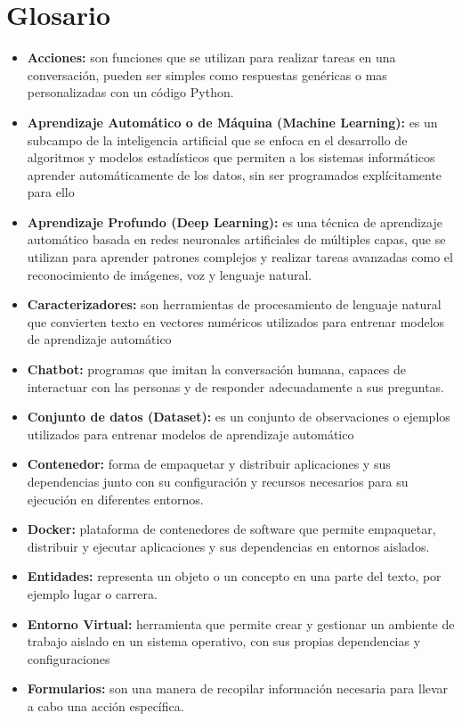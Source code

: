 \chapter[Glosario]{Glosario}
\begin{itemize}
	\item \textbf{Acciones:} son funciones que se utilizan para realizar tareas en una conversación, pueden ser simples como respuestas genéricas o mas personalizadas con un código Python.
	\item \textbf{Aprendizaje Automático o de Máquina (Machine Learning):} es un subcampo de la inteligencia artificial que se enfoca en el desarrollo de algoritmos y modelos estadísticos que permiten a los sistemas informáticos aprender automáticamente de los datos, sin ser programados explícitamente para ello 
	\item \textbf{Aprendizaje Profundo (Deep Learning):} es una técnica de aprendizaje automático basada en redes neuronales artificiales de múltiples capas, que se utilizan para aprender patrones complejos y realizar tareas avanzadas como el reconocimiento de imágenes, voz y lenguaje natural.
	\item \textbf{Caracterizadores:} son herramientas de procesamiento de lenguaje natural que convierten texto en vectores numéricos utilizados para entrenar modelos de aprendizaje automático
	\item \textbf{Chatbot:} programas que imitan la conversación humana, capaces de interactuar con las personas y de responder adecuadamente a sus preguntas.
	\item \textbf{Conjunto de datos (Dataset):} es un conjunto de observaciones o ejemplos utilizados para entrenar modelos de aprendizaje automático
	\item \textbf{Contenedor:} forma de empaquetar y distribuir aplicaciones y sus dependencias junto con su configuración y recursos necesarios para su ejecución en diferentes entornos.
	\item \textbf{Docker:} plataforma de contenedores de software que permite empaquetar, distribuir y ejecutar aplicaciones y sus dependencias en entornos aislados.
	\item \textbf{Entidades:} representa un objeto o un concepto en una parte del texto, por ejemplo lugar o carrera.
	\item \textbf{Entorno Virtual:} herramienta que permite crear y gestionar un ambiente de trabajo aislado en un sistema operativo, con sus propias dependencias y configuraciones
	\item \textbf{Formularios:} son una manera de recopilar información necesaria para llevar a cabo una acción específica.

\end{itemize}
